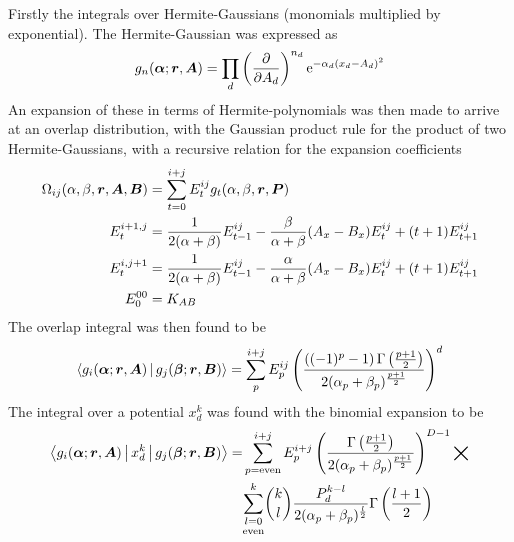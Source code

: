     Firstly the integrals over Hermite-Gaussians (monomials multiplied by
    exponential). The Hermite-Gaussian was expressed as 
        \begin{equation}
            g_n(\blds{\alpha};\blds{r},\blds{A}) = \prod_d
            \prdp{A_d}{n_d} \me^{-\alpha_d(x_d-A_d)^2}
            \label{eq:HGsumdef}
        \end{equation}
    An expansion of these in terms of Hermite-polynomials was then made to
    arrive at an overlap distribution, with the Gaussian product rule for the
    product of two Hermite-Gaussians, with a recursive relation for the
    expansion coefficients
        \begin{equation}
            \begin{aligned}
                \Omega_{ij}(\alpha,\beta,\blds{r},\blds{A},\blds{B}) &=
                \sum\limits^{i+j}_{t=0}
                E^{ij}_tg_t(\alpha,\beta,\blds{r},\blds{P}) \\
                E^{i+1,j}_t &= \frac{1}{2(\alpha + \beta)}E^{ij}_{t-1} -
                \frac{\beta}{\alpha+\beta}(A_x - B_x)E^{ij}_t +
                (t+1)E^{ij}_{t+1} \\
                E^{i,j+1}_t &= \frac{1}{2(\alpha + \beta)}E^{ij}_{t-1} -
                \frac{\alpha}{\alpha+\beta}(A_x - B_x)E^{ij}_t +
                (t+1)E^{ij}_{t+1} \\
                E^{00}_0 &= K_{AB} \\
            \end{aligned}
            \label{overlapdistdefsum}
        \end{equation}
    The overlap integral was then found to be
        \begin{equation}
            \Braket{g_i(\blds{\alpha};\blds{r},\blds{A}) |
            g_j(\blds{\beta};\blds{r},\blds{B})} = \sumE{p}{i}{j}
            \left(\frac{\left((-1)^p-1\right)\Gamma\left(\frac{p+1}{2}\right)}
            {2(\alpha_p+\beta_p)^{\frac{p+1}{2}}}\right)^d
            \label{eq:overlapintdefsum}
        \end{equation}
    The integral over a potential $x^k_d$ was found with the binomial expansion
    to be
        \begin{equation}
            \begin{aligned}
                \Braket{g_i(\blds{\alpha};\blds{r},\blds{A}) | x^k_d |
                g_j(\blds{\beta};\blds{r},\blds{B})} =&
                \suml{p=\text{even}}{i+j} E^{i+j}_p
                \left(\frac{\Gamma\left(\frac{p+1}{2}\right)}
                {2(\alpha_p+\beta_p)^{\frac{p+1}{2}}}\right)^{D-1} \bigtimes \\
                &\underset{\text{even}}{\sum\limits_{l=0}^k} {k\choose l}
                \frac{P^{k-l}_d}{2(\alpha_p+\beta_p)^{\frac{l}{2}}}
                \Gamma\left(\frac{l+1}{2}\right)
            \end{aligned}
        \end{equation}
